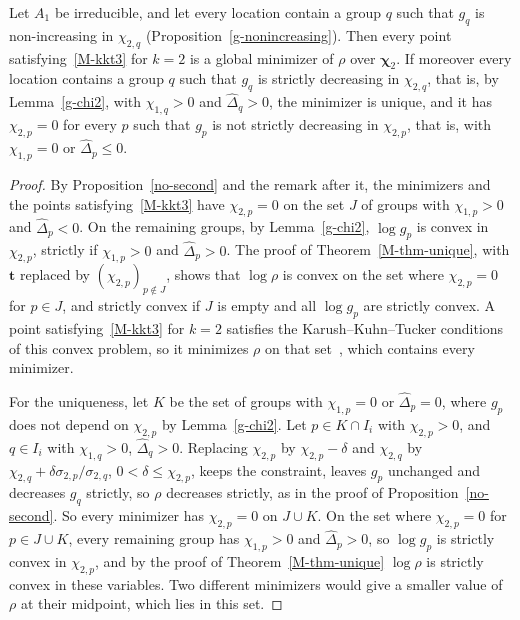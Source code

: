 \begin{theorem}\label{thm-second}
Let $A_1$ be irreducible, and let every location contain a group $q$ such
that $g_q$ is non-increasing in $\chi_{2,q}$ (Proposition~\ref{g-nonincreasing}).
Then every point satisfying~\eqref{M-kkt3} for $k=2$ is a global minimizer of
$\rho$ over $\bm\chi_2$. If moreover every location contains a group $q$ such
that $g_q$ is strictly decreasing in $\chi_{2,q}$, that is, by
Lemma~\ref{g-chi2}, with $\chi_{1,q}>0$ and $\widehat\Delta_q>0$, the minimizer is
unique, and it has $\chi_{2,p}=0$ for every $p$ such that $g_p$ is not
strictly decreasing in $\chi_{2,p}$, that is, with $\chi_{1,p}=0$ or
$\widehat\Delta_p\le 0$.
\end{theorem}
\begin{proof}
By Proposition~\ref{no-second} and the remark after it, the minimizers and the
points satisfying~\eqref{M-kkt3} have $\chi_{2,p}=0$ on the set $J$ of groups
with $\chi_{1,p}>0$ and $\widehat\Delta_p<0$. On the remaining groups, by
Lemma~\ref{g-chi2}, $\log g_p$ is convex in $\chi_{2,p}$, strictly if
$\chi_{1,p}>0$ and $\widehat\Delta_p>0$. The proof of Theorem~\ref{M-thm-unique}, with
$\bm t$ replaced by $\left(\chi_{2,p}\right)_{p\notin J}$, shows that $\log\rho$ is
convex on the set where $\chi_{2,p}=0$ for $p\in J$, and strictly convex if
$J$ is empty and all $\log g_p$ are strictly convex. A point
satisfying~\eqref{M-kkt3} for $k=2$ satisfies the Karush--Kuhn--Tucker conditions
of this convex problem, so it minimizes $\rho$ on that set~\cite[Section~5.5.3]{2004Boyd_Vandenberghe},
which contains every minimizer.

For the uniqueness, let $K$ be the set of groups with $\chi_{1,p}=0$ or
$\widehat\Delta_p=0$, where $g_p$ does not depend on $\chi_{2,p}$ by
Lemma~\ref{g-chi2}. Let $p\in K\cap I_i$ with $\chi_{2,p}>0$, and $q\in I_i$
with $\chi_{1,q}>0$, $\widehat\Delta_q>0$. Replacing $\chi_{2,p}$ by
$\chi_{2,p}-\delta$ and $\chi_{2,q}$ by $\chi_{2,q}+\delta\sigma_{2,p}/\sigma_{2,q}$,
$0<\delta\le\chi_{2,p}$, keeps the constraint, leaves $g_p$ unchanged and
decreases $g_q$ strictly, so $\rho$ decreases strictly, as in the proof of
Proposition~\ref{no-second}. So every minimizer has $\chi_{2,p}=0$ on
$J\cup K$. On the set where $\chi_{2,p}=0$ for $p\in J\cup K$, every remaining
group has $\chi_{1,p}>0$ and $\widehat\Delta_p>0$, so $\log g_p$ is strictly convex in
$\chi_{2,p}$, and by the proof of Theorem~\ref{M-thm-unique} $\log\rho$ is
strictly convex in these variables. Two different minimizers would give a
smaller value of $\rho$ at their midpoint, which lies in this set.
\end{proof}

